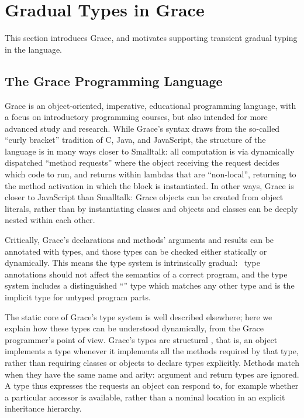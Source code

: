 
\section{Gradual Types in Grace}
\label{sec:background}

This section introduces Grace, and 
motivates supporting transient gradual typing in the language.

\subsection{The Grace Programming Language}
\label{ssec:grace}

Grace is an object-oriented, imperative, educational programming
language, with a focus on introductory programming
courses, but also intended for more advanced study and research\citep{graceOnward12,graceSigcse13}.
%
While Grace's syntax draws
from the so-called ``curly bracket'' tradition of C, Java, and
JavaScript, the structure of the language
is in many ways closer to Smalltalk:
all computation is via dynamically dispatched  ``method requests''
where the object receiving the request decides which code to run,
and
%
returns within lambdas that are ``non-local'', returning to the method
activation in which the block is instantiated\citep{bluebook}.  In
other ways, Grace is closer to JavaScript than Smalltalk: Grace
objects can be created from object literals, rather than by
instantiating classes\citep{Black2007-emeraldHOPL,JonesECOOP2016} and
objects and classes can be deeply nested within each 
other\citep{betabook}.

Critically, Grace's declarations and methods' arguments
and results can be annotated with types, and those types can be  checked
either statically or dynamically. This means the type system is
intrinsically gradual:%
%
~type annotations should not affect the semantics of a correct
program\citep{XXXSiek2015}, and the type system
includes a distinguished ``'' type which matches any other type
and is the implicit type for untyped program parts.

The static core of Grace's type system is well described
elsewhere\citep{TimJonesThesis};
here we explain how
these types can be understood 
dynamically, from the Grace programmer's point of view.
Grace's types are structural \citep{graceOnward12},
that is, an object implements a type whenever it
implements all the methods required by that type,
rather than requiring classes or objects to declare types explicitly.
Methods match when they have the same name and arity:
argument and return types are ignored.
A type thus expresses the requests an object can respond to,
for example whether a particular accessor is available,
rather than a nominal location in an explicit inheritance hierarchy.

